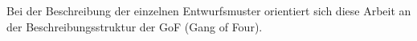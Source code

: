 Bei der Beschreibung der einzelnen Entwurfsmuster orientiert sich diese Arbeit an der Beschreibungsstruktur der GoF (Gang of Four).